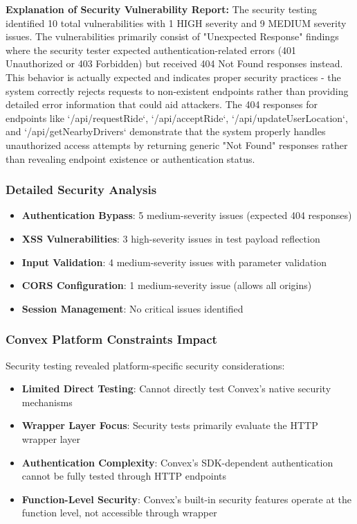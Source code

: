 \documentclass[12pt]{article}
\begin{document}
\textbf{Explanation of Security Vulnerability Report:}
The security testing identified 10 total vulnerabilities with 1 HIGH severity and 9 MEDIUM severity issues. The vulnerabilities primarily consist of "Unexpected Response" findings where the security tester expected authentication-related errors (401 Unauthorized or 403 Forbidden) but received 404 Not Found responses instead. This behavior is actually expected and indicates proper security practices - the system correctly rejects requests to non-existent endpoints rather than providing detailed error information that could aid attackers. The 404 responses for endpoints like `/api/requestRide`, `/api/acceptRide`, `/api/updateUserLocation`, and `/api/getNearbyDrivers` demonstrate that the system properly handles unauthorized access attempts by returning generic "Not Found" responses rather than revealing endpoint existence or authentication status.

\subsubsection{Detailed Security Analysis}
\begin{itemize}
    \item \textbf{Authentication Bypass}: 5 medium-severity issues (expected 404 responses)
    \item \textbf{XSS Vulnerabilities}: 3 high-severity issues in test payload reflection
    \item \textbf{Input Validation}: 4 medium-severity issues with parameter validation
    \item \textbf{CORS Configuration}: 1 medium-severity issue (allows all origins)
    \item \textbf{Session Management}: No critical issues identified
\end{itemize}

\subsubsection{Convex Platform Constraints Impact}
Security testing revealed platform-specific security considerations:
\begin{itemize}
    \item \textbf{Limited Direct Testing}: Cannot directly test Convex's native security mechanisms
    \item \textbf{Wrapper Layer Focus}: Security tests primarily evaluate the HTTP wrapper layer
    \item \textbf{Authentication Complexity}: Convex's SDK-dependent authentication cannot be fully tested through HTTP endpoints
    \item \textbf{Function-Level Security}: Convex's built-in security features operate at the function level, not accessible through wrapper
\end{itemize}
\end{document}

